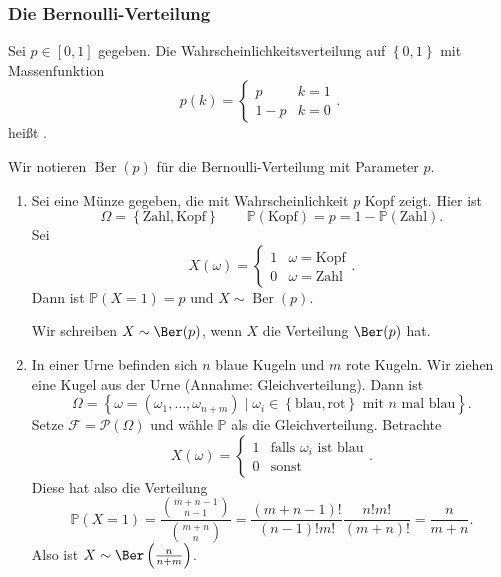 \subsubsection{Die Bernoulli-Verteilung}
\begin{definition}\label{def:bernoulli-verteilung}
    Sei $p\in [0,1]$ gegeben. Die Wahrscheinlichkeitsverteilung auf $\left \{0,1\right\} $ mit Massenfunktion
    \[
        p(k) = \begin{cases}
            p & k = 1 \\
            1-p & k = 0
        \end{cases}
    .\] 
        heißt . 
\end{definition}
\begin{notation}
    Wir notieren $\operatorname{Ber} (p)$ für die Bernoulli-Verteilung mit Parameter $p$.
\end{notation}
\begin{example}
    \begin{enumerate}[label=\protect\circled{\alph*}]
        \item Sei eine Münze gegeben, die mit Wahrscheinlichkeit $p$ Kopf zeigt. Hier ist
             \[
                 \Omega = \left \{\text{Zahl}, \text{Kopf}\right\} \qquad \mathbb{P}(\text{Kopf}) = p = 1-\mathbb{P}(\text{Zahl})
            .\] 
            Sei
            \[
                X(\omega) = \begin{cases}
                    1 & \omega = \text{Kopf} \\
                    0 & \omega = \text{Zahl}
                \end{cases}
            .\] 
            Dann ist $\mathbb{P}(X = 1) = p$ und $X \sim  \operatorname{Ber} (p)$.
            \begin{notation}
                Wir schreiben $X \sim \Ber(p)$, wenn $X$ die Verteilung  $\Ber(p)$ hat.
            \end{notation}
        \item In einer Urne befinden sich $n$ blaue Kugeln und  $m$ rote Kugeln. Wir ziehen eine Kugel aus der Urne (Annahme: Gleichverteilung). Dann ist
            \[
                \Omega = \left \{\omega = (\omega_1,\ldots,\omega_{n+m}) \mid \omega_i \in  \left \{\text{blau},\text{rot}\right\} \text{ mit $n$ mal blau} \right\} 
            .\] 
            Setze $\mathcal{F}= \mathcal{P}(\Omega)$ und wähle $\mathbb{P}$ als die Gleichverteilung. Betrachte
            \[
                X(\omega) = \begin{cases}
                    1 & \text{falls $\omega_i$ ist blau} \\
                    0 & \text{sonst}
                \end{cases}
            .\] 
Diese hat also die Verteilung
\[
    \mathbb{P}(X = 1) = \frac{\binom{m+n-1}{n-1}}{\binom{m+n}{n}} = \frac{(m+n-1)!}{(n-1)! m!} \frac{n! m!}{(m+n)!} = \frac{n}{m+n}
.\] 
Also ist $X \sim \Ber\left( \frac{n}{n+m} \right) $.
    \end{enumerate}
\end{example}

